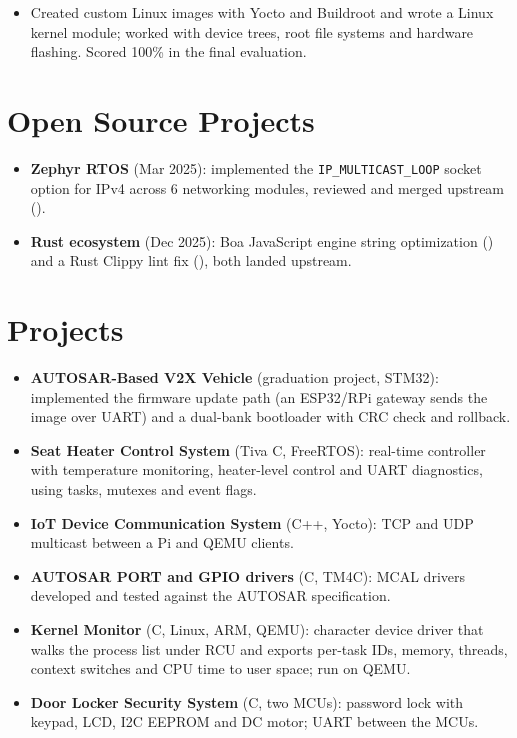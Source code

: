 \documentclass[10pt]{article}
\begin{document}
\begin{itemize}
  \item Created custom Linux images with Yocto and Buildroot and wrote a Linux kernel module; worked with device trees, root file systems and hardware flashing. Scored 100\% in the final evaluation.
\end{itemize}

\section*{Open Source Projects}
\begin{itemize}
  \item \textbf{Zephyr RTOS} (Mar 2025): implemented the \texttt{IP\_MULTICAST\_LOOP} socket option for IPv4 across 6 networking modules, reviewed and merged upstream ().
  \item \textbf{Rust ecosystem} (Dec 2025): Boa JavaScript engine string optimization () and a Rust Clippy lint fix (), both landed upstream.
\end{itemize}

\section*{Projects}
\begin{itemize}
  \item \textbf{AUTOSAR-Based V2X Vehicle} (graduation project, STM32): implemented the firmware update path (an ESP32/RPi gateway sends the image over UART) and a dual-bank bootloader with CRC check and rollback. 
  \item \textbf{Seat Heater Control System} (Tiva C, FreeRTOS): real-time controller with temperature monitoring, heater-level control and UART diagnostics, using tasks, mutexes and event flags. 
  \item \textbf{IoT Device Communication System} (C++, Yocto): TCP and UDP multicast between a Pi and QEMU clients. 
  \item \textbf{AUTOSAR PORT and GPIO drivers} (C, TM4C): MCAL drivers developed and tested against the AUTOSAR specification.
  \item \textbf{Kernel Monitor} (C, Linux, ARM, QEMU): character device driver that walks the process list under RCU and exports per-task IDs, memory, threads, context switches and CPU time to user space; run on QEMU. 
  \item \textbf{Door Locker Security System} (C, two MCUs): password lock with keypad, LCD, I2C EEPROM and DC motor; UART between the MCUs. 
\end{itemize}
\end{document}
